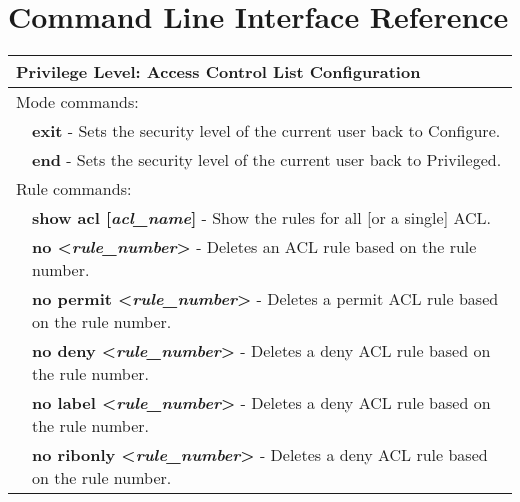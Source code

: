 \newpage
\section{Command Line Interface Reference}
\label{sec:cliref}

\begin{tabular}{|p{10pt}p{400pt}|}
\hline

\multicolumn{2}{|l|}{{\bf Privilege Level:} Access Control List Configuration }\\ 

\hline 

\multicolumn{2}{|l|}{Mode commands:}\\ 

\hline

& {\bf \small exit} - Sets the security level of the current user back to Configure. \\[4pt]

& {\bf \small end} - Sets the security level of the current user back to Privileged. \\[4pt]

\hline

\multicolumn{2}{|l|}{Rule commands:}\\ 

\hline

& {\bf \small show acl [\emph{acl\_name}]} - Show the rules for all [or a single] ACL.\\[4pt]

& {\bf \small no \textless\emph{rule\_number}\textgreater} - Deletes an ACL rule based on the rule number.\\[4pt]

& {\bf \small no permit \textless\emph{rule\_number}\textgreater} - Deletes a permit ACL rule based on the rule number.\\[4pt]

& {\bf \small no deny \textless\emph{rule\_number}\textgreater} - Deletes a deny ACL rule based on the rule number. \\[4pt]

& {\bf \small no label \textless\emph{rule\_number}\textgreater} - Deletes a deny ACL rule based on the rule number. \\[4pt]

& {\bf \small no ribonly \textless\emph{rule\_number}\textgreater} - Deletes a deny ACL rule based on the rule number. \\[4pt]


\end{tabular}
